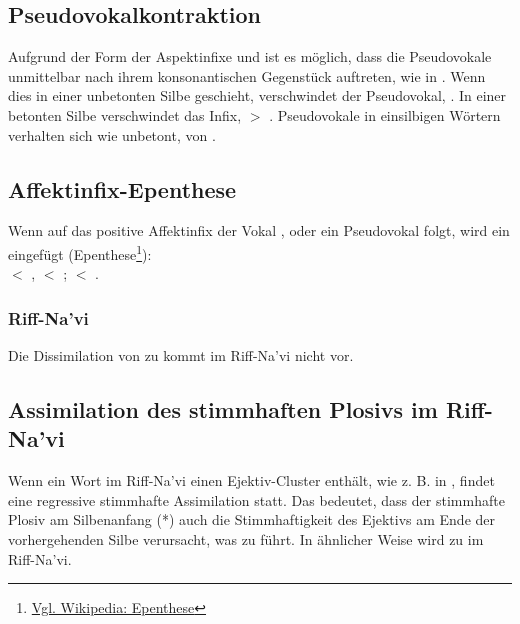 \subsection{Pseudovokalkontraktion} Aufgrund der Form der Aspektinfixe  und  ist es möglich, dass die Pseudovokale unmittelbar nach ihrem konsonantischen Gegenstück auftreten, wie in . Wenn dies in einer unbetonten Silbe geschieht, verschwindet der Pseudovokal, . In einer betonten Silbe verschwindet das Infix,  $>$ . Pseudovokale in einsilbigen Wörtern verhalten sich wie unbetont,  von . 

\subsection{Affektinfix-Epenthese} Wenn auf das positive Affektinfix  der Vokal ,  oder ein Pseudovokal folgt, wird ein  eingefügt (Epenthese\footnote{\href{https://de.wikipedia.org/wiki/Epenthese}{Vgl. Wikipedia: Epenthese}}):\\  $<$ ,  $<$ ;  $<$ .
\label{lands:eiy-epenth}

\subsubsection{Riff-Na'vi} 
Die Dissimilation von  zu  kommt im Riff-Na'vi nicht vor.


\subsection{Assimilation des stimmhaften Plosivs im Riff-Na'vi} 
Wenn ein Wort im Riff-Na'vi einen Ejektiv-Cluster enthält, wie z. B. in  , findet eine regressive stimmhafte Assimilation statt.
Das bedeutet, dass der stimmhafte Plosiv am Silbenanfang (*) auch die Stimmhaftigkeit des  Ejektivs am Ende der vorhergehenden Silbe verursacht, was zu  führt.
In ähnlicher Weise wird   zu  im Riff-Na'vi.


